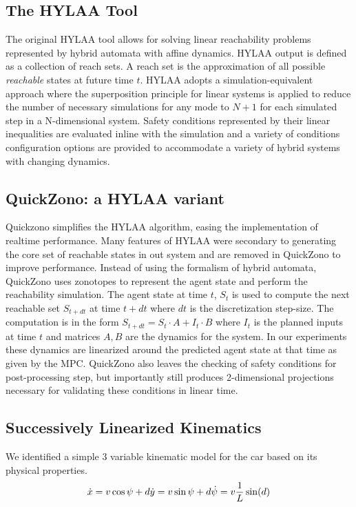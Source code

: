 \documentclass[runningheads]{llncs}
\begin{document}
\subsection{The HYLAA Tool}
The original HYLAA tool allows for solving linear reachability problems represented by hybrid automata with affine dynamics. HYLAA output is defined as a collection of reach sets. A reach set is the approximation of all possible \emph{reachable} states at future time $t$. HYLAA adopts a simulation-equivalent approach where the superposition principle for linear systems is applied to reduce the number of necessary simulations for any mode to $N+1$ for each simulated step in a N-dimensional system. Safety conditions represented by their linear inequalities are evaluated inline with the simulation and a variety of conditions configuration options are provided to accommodate a variety of hybrid systems with changing dynamics.

\subsection{QuickZono: a HYLAA variant}
Quickzono simplifies the HYLAA algorithm, easing the implementation of realtime performance. Many features of HYLAA were secondary to generating the core set of reachable states in out system and are removed in QuickZono to improve performance. Instead of using the formalism of hybrid automata, QuickZono uses zonotopes to represent the agent state and perform the reachability simulation. The agent state at time $t$, $S_t$ is used to compute the next reachable set $S_{t+dt}$ at time $t + dt$ where $dt$ is the discretization step-size. The computation is in the form $S_{t+dt} = S_t \cdot A + I_t \cdot B$ where $I_t$ is the planned inputs at time $t$ and matrices $A, B$ are the dynamics for the system. In our experiments these dynamics are linearized around the predicted agent state at that time as given by the MPC. QuickZono also leaves the checking of safety conditions for post-processing step, but importantly still produces 2-dimensional projections necessary for validating these conditions in linear time.

\subsection{Successively Linearized Kinematics}
We identified a simple 3 variable kinematic model for the car based on its physical properties.
\begin{equation}
\dot{x} = v \cos{\psi + d} \\
\dot{y} = v \sin{\psi + d} \\
\dot{\psi} = v \frac{1}{L} \sin(d)
\end{equation}
\end{document}
